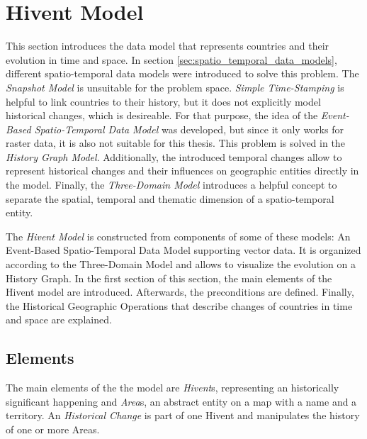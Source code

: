 
\section{Hivent Model} %
\label{sec:hivent_model}

This section introduces the data model that represents countries and their evolution in time and space. In section \ref{sec:spatio_temporal_data_models}, different spatio-temporal data models were introduced to solve this problem. The \emph{Snapshot Model} is unsuitable for the problem space. \emph{Simple Time-Stamping} is helpful to link countries to their history, but it does not explicitly model historical changes, which is desireable. For that purpose, the idea of the \emph{Event-Based Spatio-Temporal Data Model} was developed, but since it only works for raster data, it is also not suitable for this thesis. This problem is solved in the \emph{History Graph Model}. Additionally, the introduced temporal changes allow to represent historical changes and their influences on geographic entities directly in the model. Finally, the \emph{Three-Domain Model} introduces a helpful concept to separate the spatial, temporal and thematic dimension of a spatio-temporal entity.

The \emph{Hivent Model} is constructed from components of some of these models: An Event-Based Spatio-Temporal Data Model supporting vector data. It is organized according to the Three-Domain Model and allows to visualize the evolution on a History Graph. In the first section of this section, the main elements of the Hivent model are introduced. Afterwards, the preconditions are defined. Finally, the Historical Geographic Operations that describe changes of countries in time and space are explained.

\subsection{Elements} %
\label{sub:elements}

The main elements of the the model are \emph{Hivent}s, representing an historically significant happening and \emph{Area}s, an abstract entity on a map with a name and a territory. An \emph{Historical Change} is part of one Hivent and manipulates the history of one or more Areas.

\vspace{-1em}
